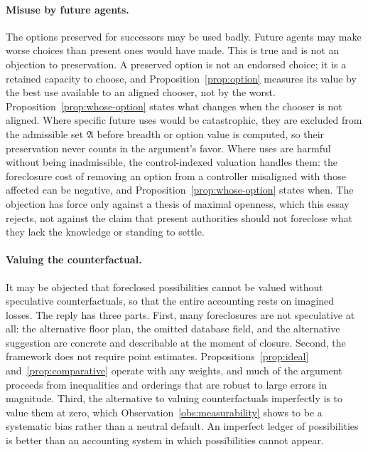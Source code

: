 \paragraph{Misuse by future agents.} The options preserved for successors may be used badly. Future agents may make worse choices than present ones would have made. This is true and is not an objection to preservation. A preserved option is not an endorsed choice; it is a retained capacity to choose, and Proposition~\ref{prop:option} measures its value by the best use available to an aligned chooser, not by the worst. Proposition~\ref{prop:whose-option} states what changes when the chooser is not aligned. Where specific future uses would be catastrophic, they are excluded from the admissible set $\mathfrak{A}$ before breadth or option value is computed, so their preservation never counts in the argument's favor. Where uses are harmful without being inadmissible, the control-indexed valuation handles them: the foreclosure cost of removing an option from a controller misaligned with those affected can be negative, and Proposition~\ref{prop:whose-option} states when. The objection has force only against a thesis of maximal openness, which this essay rejects, not against the claim that present authorities should not foreclose what they lack the knowledge or standing to settle.

\paragraph{Valuing the counterfactual.} It may be objected that foreclosed possibilities cannot be valued without speculative counterfactuals, so that the entire accounting rests on imagined losses. The reply has three parts. First, many foreclosures are not speculative at all: the alternative floor plan, the omitted database field, and the alternative suggestion are concrete and describable at the moment of closure. Second, the framework does not require point estimates. Propositions~\ref{prop:ideal} and~\ref{prop:comparative} operate with any weights, and much of the argument proceeds from inequalities and orderings that are robust to large errors in magnitude. Third, the alternative to valuing counterfactuals imperfectly is to value them at zero, which Observation~\ref{obs:measurability} shows to be a systematic bias rather than a neutral default. An imperfect ledger of possibilities is better than an accounting system in which possibilities cannot appear.

